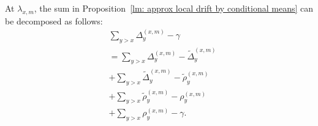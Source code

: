 \documentclass[twoside,12pt,a4paper]{article}
\numberwithin{equation}{section}
\begin{document}
At $\lambda_{x, m}$, the sum in Proposition~\ref{lm: approx local drift by conditional means} can be decomposed as follows:
\begin{align}
	\label{eqn:tempered-difference-0}
	&\sum_{y > x} \Delta_y^{(x,m)} - \gamma \\
	\label{eqn:tempered-difference-1}
	&= \sum_{y > x} \Delta_y^{(x,m)} - \tilde\Delta_y^{(x,m)} \\
	\label{eqn:tempered-difference-2}
	&+ \sum_{y > x} \tilde \Delta_{y}^{(x,m)} - \tilde\rho_y^{(x,m)} \\
	\label{eqn:tempered-difference-3}
	&+ \sum_{y > x} \tilde\rho_y^{(x,m)} - \rho_y^{(x,m)} \\
	\label{eqn:tempered-difference-4}
	&+ \sum_{y > x} \rho_y^{(x,m)} - \gamma
.\end{align}
\end{document}
